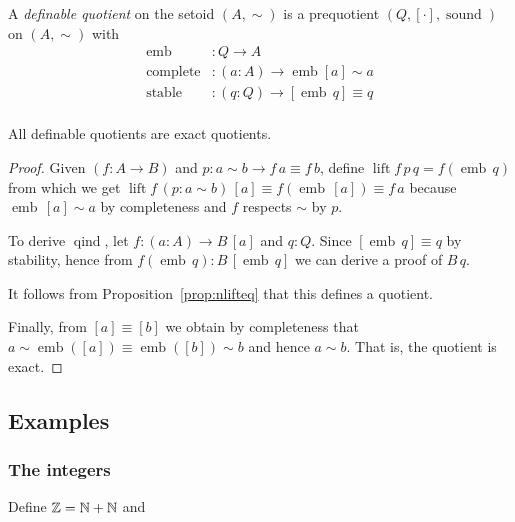 \documentclass{llncs}
\newcommand{\bocks}[1]{[#1]}
\DeclareMathOperator*{\sound}{\mathrm{sound}}
\DeclareMathOperator{\qind}{\mathrm{qind}}
\DeclareMathOperator*{\emb}{\mathrm{emb}}
\DeclareMathOperator*{\compl}{\mathrm{complete}}
\DeclareMathOperator*{\stable}{\mathrm{stable}}
\newcommand{\Z}{\mathbb{Z}}
\DeclareMathOperator{\nlift}{\mathrm{lift}}
\begin{document}
\begin{definition}\label{def:defquotients}
A \emph{definable quotient} on the setoid $(A,\sim)$ is a prequotient $(Q,\bocks\cdot,\sound)$ on $(A,\sim)$ with
\begin{align*}
\emb &: Q \to A\\
\compl &: (a : A) \to \emb {\bocks a} \sim a\\
\stable &: (q:Q) \to \bocks{\emb\,q} \equiv q\\
\end{align*}
\end{definition}

\begin{proposition}
All definable quotients are exact quotients.
\end{proposition}
\begin{proof}

Given $(f\colon A \to B)$ and $p : a\sim b \to f\,a \equiv f\,b$, define $\nlift f\, p \,q = f (\emb\,q)$ from which we get $\nlift f \,(p : a \sim b)\,\bocks a\equiv f(\emb\,\bocks a)\equiv f\,a$ because $\emb\,\bocks a\sim a$ by completeness and $f$ respects $\sim$ by $p$. 

To derive $\qind$, let $f:(a\colon A)\to B\,\bocks a$ and $q:Q$. Since $ \bocks{\emb\,q} \equiv q$ by stability, hence from $f (\emb\,q):B\,\bocks{\emb\,q}$ we can derive a proof of $B\,q$. 

It follows from Proposition~\ref{prop:nlifteq} that this defines a quotient. 

Finally, from $\bocks a \equiv \bocks b$ 
we obtain by completeness that $a\sim\emb(\bocks a)\equiv\emb(\bocks b)\sim b$ and hence $a\sim b$. That is, the quotient is exact.
\end{proof}


\subsection{Examples}\label{sec:dquotients:examples}

\subsubsection*{The integers}
Define $\Z =\nat + \nat $ and 
\end{document}

